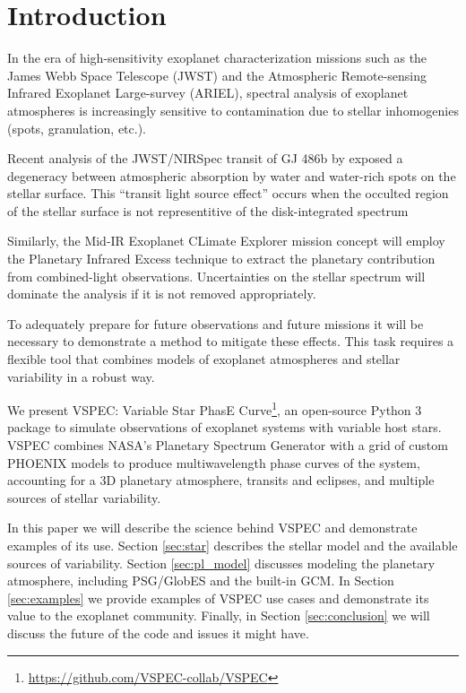 \documentclass[twocolumn]{aastex631}
\begin{document}

\section{Introduction}
\label{sec:intro}

In the era of high-sensitivity exoplanet characterization missions such as the James Webb Space Telescope (JWST)
and the Atmospheric Remote-sensing Infrared Exoplanet Large-survey (ARIEL), spectral analysis of exoplanet atmospheres
is increasingly sensitive to contamination due to stellar inhomogenies (spots, granulation, etc.).

Recent analysis of the JWST/NIRSpec transit of GJ 486b by \citet{moran2023} exposed a degeneracy between
atmospheric absorption by water and water-rich spots on the stellar surface. This ``transit light source effect''
\citep[TLS,][see also \citet{apai2018,barclay2021,garcia2022,barclay2023}]{rackham2018}
occurs when the occulted region of the stellar surface is not representitive of the disk-integrated spectrum

Similarly, the Mid-IR Exoplanet CLimate Explorer \citep[MIRECLE,][]{mandell2022} mission concept
will employ the Planetary Infrared Excess \citep[PIE][]{stevenson2020} technique to extract the planetary
contribution from combined-light observations. Uncertainties on the stellar spectrum will dominate the analysis if it is not removed appropriately.

To adequately prepare for future observations and future missions it will be necessary to demonstrate a method to mitigate these effects.
This task requires a flexible tool that combines models of exoplanet atmospheres and stellar variability in a robust way.

We present {\sc VSPEC}: Variable Star PhasE Curve\footnote{\url{https://github.com/VSPEC-collab/VSPEC}},
an open-source Python 3 package to simulate observations of exoplanet systems with variable host stars.
{\sc VSPEC} combines NASA's Planetary Spectrum Generator \citep[PSG,][]{villanueva2018} with a grid of
custom PHOENIX models \citep{husser2013} to produce multiwavelength phase curves of the system, accounting
for a 3D planetary atmosphere, transits and eclipses, and multiple sources of stellar variability.

In this paper we will describe the science behind {\sc VSPEC} and demonstrate examples of its use.
Section \ref{sec:star} describes the stellar model and the available sources of variability.
Section \ref{sec:pl_model} discusses modeling the planetary atmosphere, including PSG/GlobES and the
built-in GCM. In Section \ref{sec:examples} we provide examples of {\sc VSPEC} use cases and demonstrate
its value to the exoplanet community. Finally, in Section \ref{sec:conclusion} we will discuss the future of the code and issues it might have.


\end{document}

